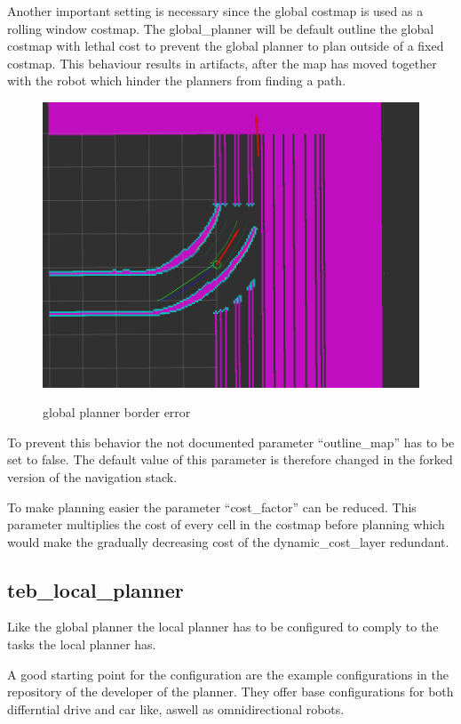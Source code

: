 Another important setting is necessary since the global costmap is used as a rolling window costmap. The global\_planner will be default outline the global costmap with lethal cost to prevent the global planner to plan outside of a fixed costmap. This behaviour results in artifacts, after the map has moved together with the robot which hinder the planners from finding a path.

\begin{figure}[H]
	\centering
	\includegraphics[width=\textwidth]{Pictures/borders}
	\label{boardererror}
	\caption{global planner border error}
\end{figure}

To prevent this behavior the not documented parameter ``outline\_map'' has to be set to false. The default value of this parameter is therefore changed in the forked version of the navigation stack.

To make planning easier the parameter ``cost\_factor'' can be reduced. This parameter multiplies the cost of every cell in the costmap before planning which
 would make the gradually decreasing cost of the dynamic\_cost\_layer redundant.

\subsection{teb\_local\_planner}

Like the global planner the local planner has to be configured to comply to the tasks the local planner has.

A good starting point for the configuration are the example configurations in the repository of the developer of the planner\cite{tebtutorials}. They offer base configurations for both differntial drive and car like, aswell as omnidirectional robots.\\

